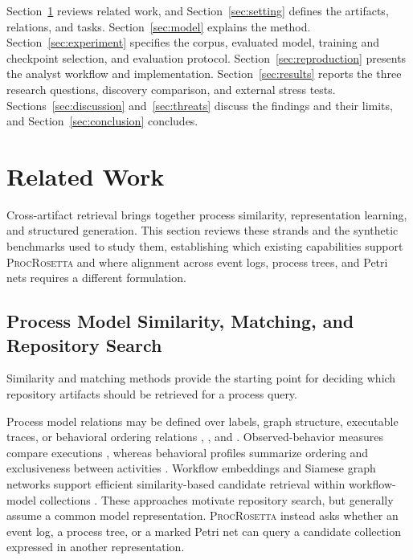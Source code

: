 \documentclass[mathematics,article,submit,moreauthors]{Definitions/mdpi}
\newcommand{\model}{\textsc{ProcRosetta}\xspace}
\begin{document}
Section~\ref{sec:related} reviews related work, and Section~\ref{sec:setting} defines the artifacts, relations, and tasks. Section~\ref{sec:model} explains the method. Section~\ref{sec:experiment} specifies the corpus, evaluated model, training and checkpoint selection, and evaluation protocol. Section~\ref{sec:reproduction} presents the analyst workflow and implementation. Section~\ref{sec:results} reports the three research questions, discovery comparison, and external stress tests. Sections~\ref{sec:discussion} and~\ref{sec:threats} discuss the findings and their limits, and Section~\ref{sec:conclusion} concludes.

\section{Related Work}\label{sec:related}

Cross-artifact retrieval brings together process similarity, representation learning, and structured generation. This section reviews these strands and the synthetic benchmarks used to study them, establishing which existing capabilities support \model and where alignment across event logs, process trees, and Petri nets requires a different formulation.

\subsection{Process Model Similarity, Matching, and Repository Search}

Similarity and matching methods provide the starting point for deciding which repository artifacts should be retrieved for a process query.

Process model relations may be defined over labels, graph structure, executable traces, or behavioral ordering relations \cite{Dijkman2011}, \cite{Schoknecht2017SimilaritySurvey}, and \cite{Zampino2026BehavioralSimilarity}. Observed-behavior measures compare executions \cite{deMedeiros2008ObservedBehavior}, whereas behavioral profiles summarize ordering and exclusiveness between activities \cite{Weidlich2011BehavioralProfiles}. Workflow embeddings and Siamese graph networks support efficient similarity-based candidate retrieval within workflow-model collections \cite{Klein2019WorkflowEmbeddings,Hoffmann2020SiameseWorkflowRetrieval}. These approaches motivate repository search, but generally assume a common model representation. \model instead asks whether an event log, a process tree, or a marked Petri net can query a candidate collection expressed in another representation.
\end{document}
